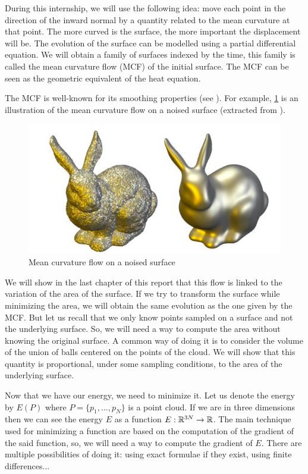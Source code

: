 During this internship, we will use the following idea: move each point in the
direction of the inward normal by a quantity related to the mean curvature at
that point. The more curved is the surface, the more important the displacement
will be. The evolution of the surface can be modelled using a partial
differential equation. We will obtain a family of surfaces indexed by the time,
this family is called the mean curvature flow (MCF) of the initial surface.
The MCF can be seen as the geometric equivalent of the heat equation.


The MCF is well-known for its smoothing properties (see
\cite{ciomaga2010level}). For example, \ref{fig:mean-curvature-flow-ex} is an
illustration of the mean curvature flow on a noised surface (extracted from
\cite{clarenz2000anisotropic}).

\begin{figure}[h]
    \centering
    \includegraphics[scale=0.3]{img/mean-curvature-flow-rabbit}
    \caption{Mean curvature flow on a noised surface}
    \label{fig:mean-curvature-flow-ex}
\end{figure}

We will show in the last chapter of this report that this flow is linked to the
variation of the area of the surface. If we try to transform the surface while
minimizing the area, we will obtain the same evolution as the one given by the
MCF. But let us recall that we only know points sampled on a surface and not the
underlying surface. So, we will need a way to compute the area without knowing
the original surface. A common way of doing it is to consider the volume of the
union of balls centered on the points of the cloud.  We will show that this
quantity is proportional, under some sampling conditions, to the area of the
underlying surface.

Now that we have our energy, we need to minimize it. Let us denote the energy by
$ E(P) $ where $ P = \{ p_1, \ldots, p_N \} $ is a point cloud. If we are in
three dimensions then we can see the energy $ E $ as a function $ E : \mathbb{R}^{3N}
\to \mathbb{R} $. The main technique used for minimizing a function are based on the
computation of the gradient of the said function, so, we will need a way to
compute the gradient of $ E $. There are multiple possibilities of doing it:
using exact formulae if they exist, using finite differences...


